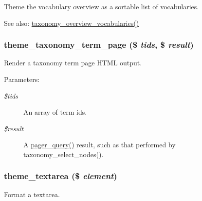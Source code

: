 Theme the vocabulary overview as a sortable list of vocabularies.

\begin{Desc}
\item[See also:]\hyperlink{group__forms_g1540d991eabc53c2c1af6629455035ff}{taxonomy\_\-overview\_\-vocabularies()} \end{Desc}
\hypertarget{group__themeable_g75a8915bc5bf8c1f69d1b5956761608e}{
\subsubsection[{theme\_\-taxonomy\_\-term\_\-page}]{\setlength{\rightskip}{0pt plus 5cm}theme\_\-taxonomy\_\-term\_\-page (\$ {\em tids}, \/  \$ {\em result})}}
\label{group__themeable_g75a8915bc5bf8c1f69d1b5956761608e}


Render a taxonomy term page HTML output.

\begin{Desc}
\item[Parameters:]
\begin{description}
\item[{\em \$tids}]An array of term ids. \item[{\em \$result}]A \hyperlink{group__database_ge456e13108bb88fa7a532e1cccdeaa50}{pager\_\-query()} result, such as that performed by taxonomy\_\-select\_\-nodes(). \end{description}
\end{Desc}
\hypertarget{group__themeable_g75a9f062a41e0208ae2a70feaf715109}{
\subsubsection[{theme\_\-textarea}]{\setlength{\rightskip}{0pt plus 5cm}theme\_\-textarea (\$ {\em element})}}
\label{group__themeable_g75a9f062a41e0208ae2a70feaf715109}


Format a textarea.

